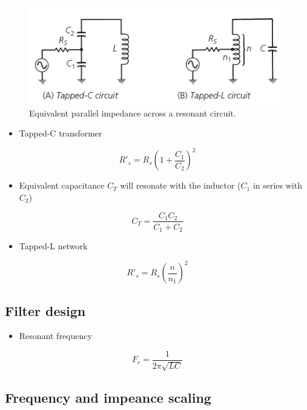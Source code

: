 \begin{figure} [H]
	\centering
	\includegraphics[width=0.8\linewidth]{graphics/25.png}
	\caption{Equivalent parallel impedance across a resonant circuit.}
	\label{fig:25}
\end{figure}

\begin{itemize}
	\item Tapped-C transformer
\end{itemize}

\begin{equation}
R'_s = R_s \left(1+\dfrac{C_1}{C_2}\right)^2
\end{equation}

\begin{itemize}
	\item Equivalent capacitance $C_T$ will resonate with the inductor ($C_1$ in series with $C_2$)
\end{itemize}

\begin{equation}
C_T=\dfrac{C_1 C_2}{C_1+C_2}
\end{equation}

\begin{itemize}
	\item Tapped-L network
\end{itemize}

\begin{equation}
R'_s = R_s \left(\dfrac{n}{n_1}\right)^2
\end{equation}


\subsection{Filter design}
\begin{itemize}
	\item Resonant frequency
\end{itemize}

\begin{equation}
F_r=\dfrac{1}{2\pi\sqrt{L C}}
\end{equation}

\subsection{Frequency and impeance scaling}
